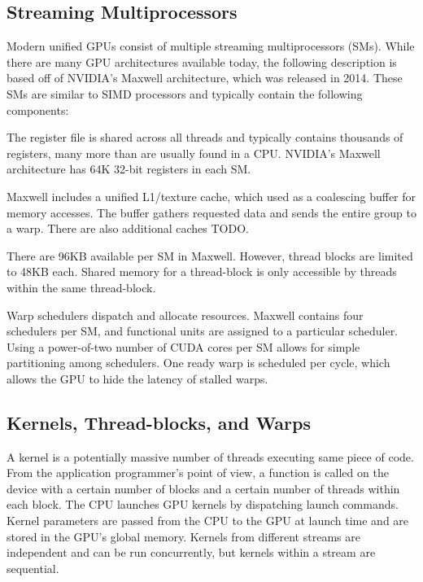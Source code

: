 \documentclass[prodmode,acmtecs]{acmsmall} %
\begin{document}
\subsection{Streaming Multiprocessors}
Modern unified GPUs consist of multiple streaming multiprocessors (SMs). While
there are many GPU architectures available today, the following description is
based off of NVIDIA's Maxwell architecture, which was released in 2014. These
SMs are similar to SIMD processors and typically contain the following
components:
\begin{description}
  \setlength\itemsep{0.5em}
  \item[A large register file] The register file is shared across all threads
  and typically contains thousands of registers, many more than are usually
  found in a CPU. NVIDIA's Maxwell architecture has 64K 32-bit registers in each
  SM.
  \item[Multiple caches] Maxwell includes a unified L1/texture cache, which used
  as a coalescing buffer for memory accesses. The buffer gathers requested data
  and sends the entire group to a warp. There are also additional caches TODO.
  \item[Shared memory] There are 96KB available per SM in Maxwell. However,
  thread blocks are limited to 48KB each. Shared memory for a thread-block is
  only accessible by threads within the same thread-block.
  \item[Multiple warp schedulers] Warp schedulers dispatch and allocate
  resources. Maxwell contains four schedulers per SM, and functional units are
  assigned to a particular scheduler. Using a power-of-two number of CUDA cores
  per SM allows for simple partitioning among schedulers. One ready warp is
  scheduled per cycle, which allows the GPU to hide the latency of stalled
  warps.
\end{description}

\subsection{Kernels, Thread-blocks, and Warps}
A kernel is a potentially massive number of threads executing same piece of
code. From the application programmer's point of view, a function is called on
the device with a certain number of blocks and a certain number of threads
within each block. The CPU launches GPU kernels by dispatching launch commands.
Kernel parameters are passed from the CPU to the GPU at launch time and are
stored in the GPU's global memory. Kernels from different streams are
independent and can be run concurrently, but kernels within a stream are
sequential.
\end{document}
